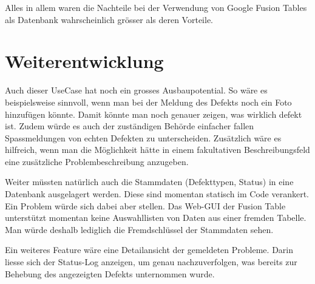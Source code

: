 Alles in allem waren die Nachteile bei der Verwendung von Google Fusion Tables als Datenbank wahrscheinlich grösser als deren Vorteile.

\section{Weiterentwicklung}
Auch dieser UseCase hat noch ein grosses Ausbaupotential. So wäre es beispielsweise sinnvoll, wenn man bei der Meldung des Defekts noch ein Foto hinzufügen könnte. Damit könnte man noch genauer zeigen, was wirklich defekt ist. Zudem würde es auch der zuständigen Behörde einfacher fallen Spassmeldungen von echten Defekten zu unterscheiden. Zusätzlich wäre es hilfreich, wenn man die Möglichkeit hätte in einem fakultativen Beschreibungsfeld eine zusätzliche Problembeschreibung anzugeben.

Weiter müssten natürlich auch die Stammdaten (Defekttypen, Status) in eine Datenbank ausgelagert werden. Diese sind momentan statisch im Code verankert. Ein Problem würde sich dabei aber stellen. Das Web-GUI der Fusion Table unterstützt momentan keine Auswahllisten von Daten aus einer fremden Tabelle. Man würde deshalb lediglich die Fremdschlüssel der Stammdaten sehen.

Ein weiteres Feature wäre eine Detailansicht der gemeldeten Probleme. Darin liesse sich der Status-Log anzeigen, um genau nachzuverfolgen, was bereits zur Behebung des angezeigten Defekts unternommen wurde. 